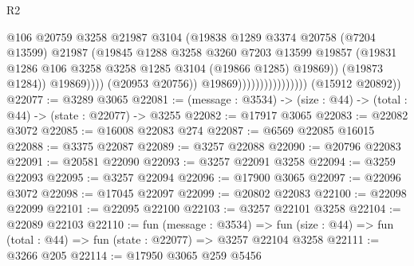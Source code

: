 \begin{lexlean}{R2}
\begin{coremodule}
                                                @106
                                                @20759
                                                @3258
                                                @21987
                                                @3104
                                                (@19838
                                                  @1289
                                                  @3374
                                                  @20758
                                                  (@7204 @13599)
                                                  @21987
                                                  (@19845
                                                    @1288
                                                    @3258
                                                    @3260
                                                    @7203
                                                    @13599
                                                    @19857
                                                    (@19831
                                                      @1286
                                                      @106
                                                      @3258
                                                      @3258
                                                      @1285
                                                      @3104
                                                      (@19866 @1285)
                                                      @19869))
                                                  (@19873 @1284))
                                                @19869))))
                                        (@20953 @20756))
                                      @19869))))))))))))))))
      (@15912 @20892))
@22077 := @3289 @3065
@22081 := (message : @3534) -> (size : @44) -> (total : @44) -> (state : @22077) -> @3255
@22082 := @17917 @3065
@22083 := @22082 @3072
@22085 := @16008 @22083 @274
@22087 := @6569 @22085 @16015
@22088 := @3375 @22087
@22089 := @3257 @22088
@22090 := @20796 @22083
@22091 := @20581 @22090
@22093 := @3257 @22091 @3258
@22094 := @3259 @22093
@22095 := @3257 @22094
@22096 := @17900 @3065
@22097 := @22096 @3072
@22098 := @17045 @22097
@22099 := @20802 @22083
@22100 := @22098 @22099
@22101 := @22095 @22100
@22103 := @3257 @22101 @3258
@22104 := @22089 @22103
@22110 := fun (message : @3534) =>
  fun (size : @44) => fun (total : @44) => fun (state : @22077) => @3257 @22104 @3258
@22111 := @3266 @205
@22114 := @17950 @3065 @259 @5456

\end{coremodule}
\end{lexlean}
